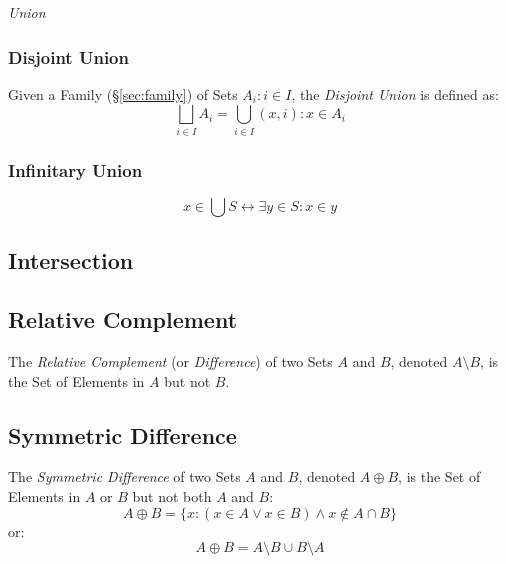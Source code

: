 \emph{Union}



\subsubsection{Disjoint Union}\label{sec:disjoint_union}

Given a Family (\S\ref{sec:family}) of Sets ${A_i : i \in I}$,
the \emph{Disjoint Union} is defined as:
\[
  \bigsqcup_{i \in I} A_i = \bigcup_{i \in I} {(x,i) : x \in A_i}
\]



\subsubsection{Infinitary Union}\label{sec:infinitary_union}

\[
  x \in \bigcup S \leftrightarrow \exists y \in S : x \in y
\]



\subsection{Intersection}\label{sec:intersection}

\subsection{Relative Complement}\label{sec:relative_complement}

The \emph{Relative Complement} (or \emph{Difference}) of two Sets $A$
and $B$, denoted $A \setminus B$, is the Set of Elements in $A$ but
not $B$.



\subsection{Symmetric Difference}\label{sec:symmetric_difference}

The \emph{Symmetric Difference} of two Sets $A$ and $B$, denoted $A
\oplus B$, is the Set of Elements in $A$ or $B$ but not both $A$ and
$B$:
\[
  A \oplus B =
  \{ x : (x \in A \vee x \in B) \wedge x \notin A \cap B \}
\]
or:
\[
  A \oplus B = A \setminus B \cup B \setminus A
\]



